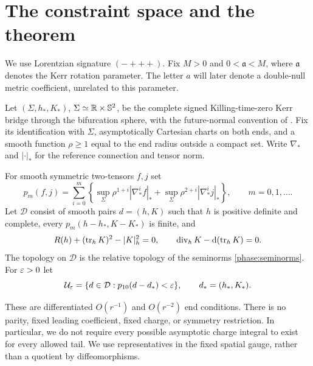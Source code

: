 \section{The constraint space and the theorem}
\label{sec:phase}

We use Lorentzian signature \((-+++)\). Fix \(M>0\) and
\(0<\mathfrak a<M\), where \(\mathfrak a\) denotes the Kerr rotation
parameter. The letter \(a\) will later denote a double-null metric
coefficient, unrelated to this parameter.

Let \((\Sigma,h_*,K_*)\), \(\Sigma\simeq\mathbb R\times\mathbb S^2\), be the
complete signed Killing-time-zero Kerr bridge through the bifurcation
sphere, with the future-normal convention of
\cite[ and ]{Foundation}. Fix its identification with \(\Sigma\),
asymptotically Cartesian charts on both ends, and a smooth function
\(\rho\ge1\) equal to the end radius outside a compact set.
Write \(\nabla_*\) and \(|\cdot|_*\) for the reference connection and
tensor norm.

\begin{definition}
\label{phase:space}
For smooth symmetric two-tensors \(f,j\) set
\begin{equation}
\label{phase:seminorms}
 p_m(f,j)=\sum_{i=0}^m
 \left\{\sup_\Sigma \rho^{1+i}|\nabla_*^if|_*
       +\sup_\Sigma \rho^{2+i}|\nabla_*^ij|_*\right\},
 \qquad m=0,1,\ldots.
\end{equation}
Let \(\mathcal D\) consist of smooth pairs \(d=(h,K)\) such that \(h\)
is positive definite and complete, every \(p_m(h-h_*,K-K_*)\) is finite,
and
\begin{equation}
\label{phase:constraints}
 R(h)+(\operatorname{tr}_hK)^2-|K|_h^2=0,\qquad
 \operatorname{div}_hK-\mathrm d(\operatorname{tr}_hK)=0.
\end{equation}
The topology on \(\mathcal D\) is the relative topology of the seminorms
\eqref{phase:seminorms}. For \(\varepsilon>0\) let
\[
 \mathcal U_\varepsilon=\{d\in\mathcal D:p_{10}(d-d_*)<\varepsilon\},
 \qquad d_*=(h_*,K_*).
\]
\end{definition}

These are differentiated \(O(r^{-1})\) and \(O(r^{-2})\) end conditions.
There is no parity, fixed leading coefficient, fixed charge, or symmetry
restriction. In particular, we do not require every possible
asymptotic charge integral to exist for every allowed tail.
We use representatives in the fixed spatial gauge, rather than a
quotient by diffeomorphisms.

